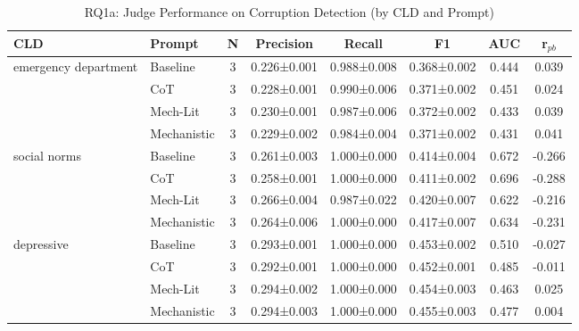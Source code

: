 \begin{table}[htbp]
\centreing
\caption{RQ1a: Judge Performance on Corruption Detection (by CLD and Prompt)}
\label{tab:rq1a_main}
\begin{tabular}{llcccccc}
\toprule
\textbf{CLD} & \textbf{Prompt} & \textbf{N} & \textbf{Precision} & \textbf{Recall} & \textbf{F1} & \textbf{AUC} & \textbf{r$_{pb}$} \\
\midrule
emergency department & Baseline & 3 & 0.226±0.001 & 0.988±0.008 & 0.368±0.002 & 0.444 & 0.039 \\
 & CoT & 3 & 0.228±0.001 & 0.990±0.006 & 0.371±0.002 & 0.451 & 0.024 \\
 & Mech-Lit & 3 & 0.230±0.001 & 0.987±0.006 & 0.372±0.002 & 0.433 & 0.039 \\
 & Mechanistic & 3 & 0.229±0.002 & 0.984±0.004 & 0.371±0.002 & 0.431 & 0.041 \\
\midrule
social norms & Baseline & 3 & 0.261±0.003 & 1.000±0.000 & 0.414±0.004 & 0.672 & -0.266 \\
 & CoT & 3 & 0.258±0.001 & 1.000±0.000 & 0.411±0.002 & 0.696 & -0.288 \\
 & Mech-Lit & 3 & 0.266±0.004 & 0.987±0.022 & 0.420±0.007 & 0.622 & -0.216 \\
 & Mechanistic & 3 & 0.264±0.006 & 1.000±0.000 & 0.417±0.007 & 0.634 & -0.231 \\
\midrule
depressive & Baseline & 3 & 0.293±0.001 & 1.000±0.000 & 0.453±0.002 & 0.510 & -0.027 \\
 & CoT & 3 & 0.292±0.001 & 1.000±0.000 & 0.452±0.001 & 0.485 & -0.011 \\
 & Mech-Lit & 3 & 0.294±0.002 & 1.000±0.000 & 0.454±0.003 & 0.463 & 0.025 \\
 & Mechanistic & 3 & 0.294±0.003 & 1.000±0.000 & 0.455±0.003 & 0.477 & 0.004 \\
\midrule
\bottomrule
\end{tabular}
\end{table}